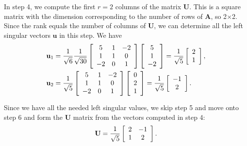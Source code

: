 In step 4, we compute the first $r = 2$ columns of the matrix $\mathbf{U}$. This is a square matrix with the dimension corresponding to the number of rows of $\mathbf{A}$, so 2$\times$2. Since the rank equals the number of columns of $\mathbf{U}$, we can determine all the left singular vectors $\mathbf{u}$ in this step. We have
\begin{subequations}
\begin{align}
  \mathbf{u}_1 &= \frac{1}{\sqrt{6}} \frac{1}{\sqrt{30}} 
   \left[ \begin{array}{c c c}
   5 &  1 & -2 \\
   1 &  1 &  0 \\ 
  -2 &  0 &  1 \\ \end{array} \right] 
  \left[ \begin{array}{c}  5 \\  1 \\ -2 \\ \end{array} \right] =
  \frac{1}{ \sqrt{5} } \left[ \begin{array}{c} 2 \\  1 \\ \end{array} \right] , \\
  \mathbf{u}_2 &= \frac{1}{\sqrt{5}} 
   \left[ \begin{array}{c c c}
   5 &  1 & -2 \\
   1 &  1 &  0 \\ 
  -2 &  0 &  1 \\ \end{array} \right] 
  \left[ \begin{array}{c}  0 \\  2 \\  1 \\ \end{array} \right] =
  \frac{1}{ \sqrt{5} } \left[ \begin{array}{c} -1 \\  2 \\ \end{array} \right] .
\end{align}
\end{subequations}

Since we have all the needed left singular values, we skip step 5 and move onto step 6 and form the $\mathbf{U}$ matrix from the vectors computed in step 4:
\begin{align}
  \mathbf{U} = \frac{1}{\sqrt{5}} \left[ \begin{array}{c c}
  2		& -1	\\
  1		&  2	\\ \end{array} \right] .
\end{align}

